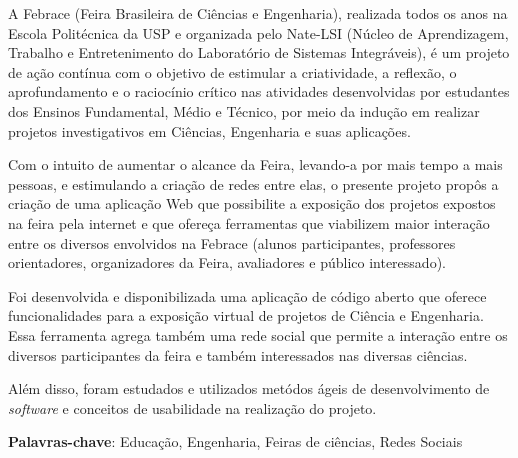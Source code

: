 
\begin{resumo}

A Febrace (Feira Brasileira de Ciências e Engenharia), realizada todos os anos na Escola Politécnica da USP e organizada pelo Nate-LSI (Núcleo de Aprendizagem, Trabalho e Entretenimento do Laboratório de Sistemas Integráveis), é um projeto de ação contínua com o objetivo de estimular a criatividade, a reflexão, o aprofundamento e o raciocínio crítico nas atividades desenvolvidas por estudantes dos Ensinos Fundamental, Médio e Técnico, por meio da indução em realizar projetos investigativos em Ciências, Engenharia e suas aplicações.

Com o intuito de aumentar o alcance da Feira, levando-a por mais tempo a mais pessoas, e estimulando a criação de redes entre elas, o presente projeto propôs a criação de uma aplicação Web que possibilite a exposição dos projetos expostos na feira pela internet e que ofereça ferramentas que viabilizem maior interação entre os diversos envolvidos na Febrace (alunos participantes, professores orientadores, organizadores da Feira, avaliadores e público interessado).

Foi desenvolvida e disponibilizada uma aplicação de código aberto que oferece funcionalidades para a exposição virtual de projetos de Ciência e Engenharia. Essa ferramenta agrega também uma rede social que permite a interação entre os diversos participantes da feira e também interessados nas diversas ciências.

Além disso, foram estudados e utilizados metódos ágeis de desenvolvimento de \textit{software} e conceitos de usabilidade na realização do projeto.

\vspace{1.5ex}

{\bf Palavras-chave}: Educação, Engenharia, Feiras de ciências, Redes Sociais

\end{resumo}

